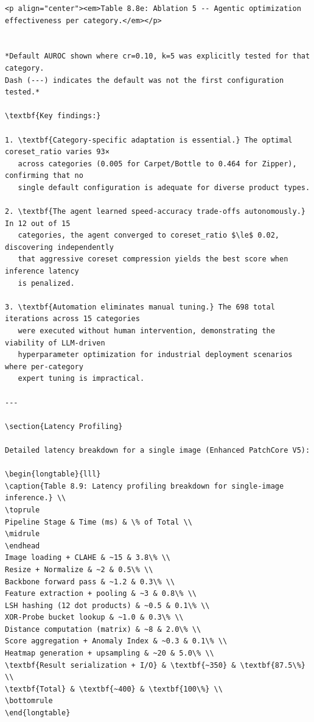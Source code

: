\documentclass[12pt,a4paper,oneside]{report}
\begin{document}
\begin{verbatim}
<p align="center"><em>Table 8.8e: Ablation 5 -- Agentic optimization effectiveness per category.</em></p>


*Default AUROC shown where cr=0.10, k=5 was explicitly tested for that category. 
Dash (---) indicates the default was not the first configuration tested.*

\textbf{Key findings:}

1. \textbf{Category-specific adaptation is essential.} The optimal coreset_ratio varies 93× 
   across categories (0.005 for Carpet/Bottle to 0.464 for Zipper), confirming that no 
   single default configuration is adequate for diverse product types.

2. \textbf{The agent learned speed-accuracy trade-offs autonomously.} In 12 out of 15 
   categories, the agent converged to coreset_ratio $\le$ 0.02, discovering independently 
   that aggressive coreset compression yields the best score when inference latency 
   is penalized.

3. \textbf{Automation eliminates manual tuning.} The 698 total iterations across 15 categories 
   were executed without human intervention, demonstrating the viability of LLM-driven 
   hyperparameter optimization for industrial deployment scenarios where per-category 
   expert tuning is impractical.

---

\section{Latency Profiling}

Detailed latency breakdown for a single image (Enhanced PatchCore V5):

\begin{longtable}{lll}
\caption{Table 8.9: Latency profiling breakdown for single-image inference.} \\
\toprule
Pipeline Stage & Time (ms) & \% of Total \\
\midrule
\endhead
Image loading + CLAHE & ~15 & 3.8\% \\
Resize + Normalize & ~2 & 0.5\% \\
Backbone forward pass & ~1.2 & 0.3\% \\
Feature extraction + pooling & ~3 & 0.8\% \\
LSH hashing (12 dot products) & ~0.5 & 0.1\% \\
XOR-Probe bucket lookup & ~1.0 & 0.3\% \\
Distance computation (matrix) & ~8 & 2.0\% \\
Score aggregation + Anomaly Index & ~0.3 & 0.1\% \\
Heatmap generation + upsampling & ~20 & 5.0\% \\
\textbf{Result serialization + I/O} & \textbf{~350} & \textbf{87.5\%} \\
\textbf{Total} & \textbf{~400} & \textbf{100\%} \\
\bottomrule
\end{longtable}




\end{verbatim}
\end{document}
